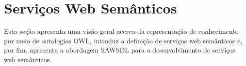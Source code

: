 \section{Serviços Web Semânticos}\label{2-fundamentacao-sws}

Esta seção apresenta uma visão geral acerca da representação de conhecimento por meio de ontologias OWL, introduz a definição de serviços web semânticos e, por fim, apresenta a abordagem SAWSDL para o desenvolvimento de serviços web semânticos.




%
%